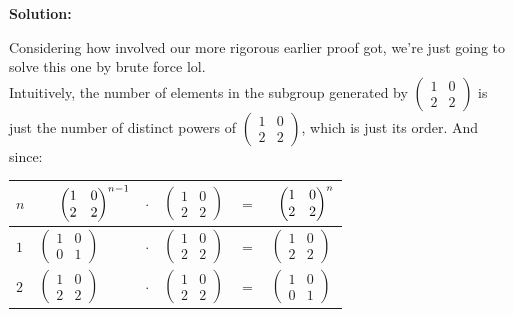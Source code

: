 \documentclass{article}
\newenvironment{solution}{
	\vspace{.5em}
	\par
	\begin{adjustwidth}{1.5em}{}
	\textbf{{Solution:}}
	\par
	\vspace{.5em}
}{
	\vspace{1em}
	\end{adjustwidth}
	\setcounter{step}{0}
}
\newcounter{step}
\begin{document}
\begin{solution}
	Considering how involved our more rigorous earlier proof got, we're just going to solve this one by brute force lol. \\

	Intuitively, the number of elements in the subgroup generated by $\begin{pmatrix} 1 & 0 \\ 2 & 2 \end{pmatrix}$ is just the number of distinct powers of $\begin{pmatrix} 1 & 0 \\ 2 & 2 \end{pmatrix}$, which is just its order. And since:

	\vspace{2em}

	\begin{tabularx}{\linewidth}{Y || Y Y Y Y Y}
		$n$ & $\hspace{1.5em} {\begin{pmatrix} 1 & 0 \\ 2 & 2 \end{pmatrix}}^{n - 1}$ & $\cdot$ & $\begin{pmatrix} 1 & 0 \\ 2 & 2 \end{pmatrix}$ & $=$ & $\hspace{0.5em}{\begin{pmatrix} 1 & 0 \\ 2 & 2 \end{pmatrix}}^{n}$ \\[10pt]
		\hline
		\hline
		$1$ & \rule{0pt}{18pt}$\begin{pmatrix} 1 & 0 \\ 0 & 1 \end{pmatrix}$ & $\cdot$ & $\begin{pmatrix} 1 & 0 \\ 2 & 2 \end{pmatrix}$ & $=$ & $\begin{pmatrix} 1 & 0 \\ 2 & 2 \end{pmatrix}$ \\[10pt]
		$2$ & $\begin{pmatrix} 1 & 0 \\ 2 & 2 \end{pmatrix}$ & $\cdot$ & $\begin{pmatrix} 1 & 0 \\ 2 & 2 \end{pmatrix}$ & $=$ & $\begin{pmatrix} 1 & 0 \\ 0 & 1 \end{pmatrix}$ \\
	\end{tabularx}


\end{solution}
\end{document}
